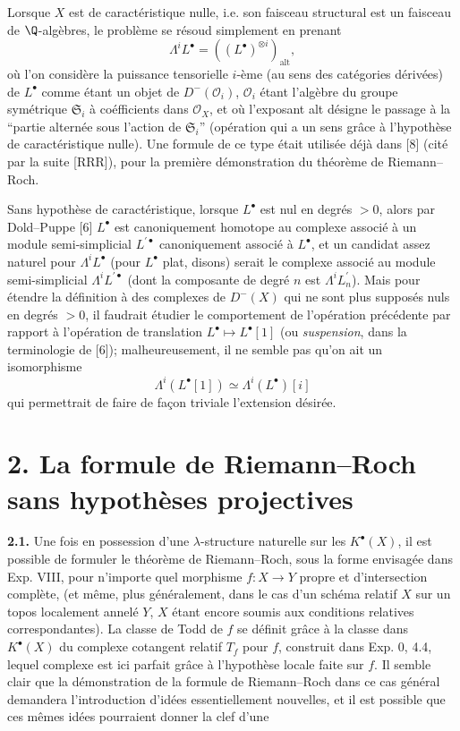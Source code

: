 Lorsque $X$ est de caractéristique nulle, i.e. son faisceau structural est un faisceau de $\Q$-algèbres, le problème se résoud simplement en prenant
\begin{equation}\tag{1.2}
 \Lambda^i L^\bullet=\left((L^\bullet)^{\otimes i}\right)_{\mathrm{alt}},
\end{equation}
où l'on considère la puissance tensorielle $i$-ème (au sens des catégories dérivées) de $L^\bullet$ comme étant un objet de $D^-(\mathcal O_i)$, $\mathcal O_i$ étant l'algèbre du groupe symétrique $\mathfrak S_i$ à coéfficients dans $\mathcal O_X$, et où l'exposant alt désigne le passage à la ``partie alternée sous l'action de $\mathfrak S_i$'' (opération qui a un sens grâce à l'hypothèse de caractéristique nulle). Une formule de ce type était utilisée déjà dans [8] (cité par la suite [RRR]), pour la première démonstration du théorème de Riemann--Roch.

Sans hypothèse de caractéristique, lorsque $L^\bullet$ est nul en degrés $>0$, alors par Dold--Puppe [6] $L^\bullet$ est canoniquement homotope au complexe associé à un module semi-simplicial $L^{\prime\bullet}$ canoniquement associé à $L^\bullet$, et un candidat assez naturel pour $\Lambda^iL^\bullet$ (pour $L^\bullet$ plat, disons) serait le complexe associé au module semi-simplicial $\Lambda^iL^{\prime\bullet}$ (dont la composante de degré $n$ est $\Lambda^i L^{\prime}_n$). Mais pour étendre la définition à des complexes de $D^-(X)$ qui ne sont plus supposés nuls en degrés $>0$, il faudrait étudier le comportement de l'opération précédente par rapport à l'opération de translation $L^\bullet\mapsto L^\bullet[1]$ (ou \emph{suspension}, dans la terminologie de [6]); malheureusement, il ne semble pas qu'on ait un isomorphisme
\[
 \Lambda^i(L^\bullet[1])\simeq \Lambda^i(L^\bullet)[i]
\]
qui permettrait de faire de façon triviale l'extension désirée.

\section*{2. La formule de Riemann--Roch sans hypothèses projectives}

\textbf{2.1.} Une fois en possession d'une $\lambda$-structure naturelle sur les $K^\bullet(X)$, il est possible de formuler le théorème de Riemann--Roch, sous la forme envisagée dans Exp. VIII, pour n'importe quel morphisme $f:X\to Y$ propre et d'intersection complète, (et même, plus généralement, dans le cas d'un schéma relatif $X$ sur un topos localement annelé $Y$, $X$ étant encore soumis aux conditions relatives correspondantes). La classe de Todd de $f$ se définit grâce à la classe dans $K^\bullet(X)$ du complexe cotangent relatif $T_f$ pour $f$, construit dans Exp. 0, 4.4, lequel complexe est ici parfait grâce à l'hypothèse locale faite sur $f$. Il semble clair que la démonstration de la formule de Riemann--Roch dans ce cas général demandera l'introduction d'idées essentiellement nouvelles, et il est possible que ces mêmes idées pourraient donner la clef d'une

